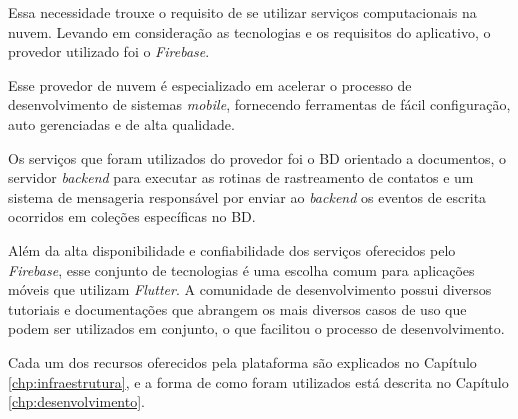 Essa necessidade trouxe o requisito de se utilizar serviços computacionais na nuvem. Levando em consideração as tecnologias e os requisitos do aplicativo, o provedor utilizado foi o \textit{Firebase}.

Esse provedor de nuvem é especializado em acelerar o processo de desenvolvimento de sistemas \textit{mobile}, fornecendo ferramentas de fácil configuração, auto gerenciadas e de alta qualidade.

Os serviços que foram utilizados do provedor foi o BD orientado a documentos, o servidor \textit{backend} para executar as rotinas de rastreamento de contatos e um sistema de mensageria responsável por enviar ao \textit{backend} os eventos de escrita ocorridos em coleções específicas no BD.

Além da alta disponibilidade e confiabilidade dos serviços oferecidos pelo \textit{Firebase}, esse conjunto de tecnologias é uma escolha comum para aplicações móveis que utilizam \textit{Flutter}. A comunidade de desenvolvimento possui diversos tutoriais e documentações que abrangem os mais diversos casos de uso que podem ser utilizados em conjunto, o que facilitou o processo de desenvolvimento.

Cada um dos recursos oferecidos pela plataforma são explicados no Capítulo \ref{chp:infraestrutura}, e a forma de como foram utilizados está descrita no Capítulo \ref{chp:desenvolvimento}.